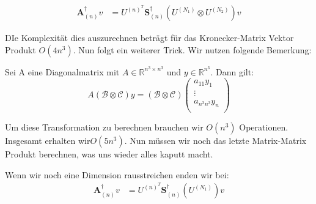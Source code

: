 \begin{equation}
\begin{aligned}
\mathcal{\textbf{A}}^{\dagger}_{(n)}v&= U^{ (n) ^{T} }  \mathcal{\textbf{S}}^{\dagger}_{(n)} ( U^{ (N_{1})  } \otimes U^{ (N_{2})} ) v
\end{aligned}
\end{equation}

DIe Komplexität dies auszurechnen beträgt für das Kronecker-Matrix Vektor Produkt $O(4n^3)$. Nun folgt ein weiterer Trick. Wir nutzen folgende Bemerkung:

\begin{Bemerkung}
Sei A eine Diagonalmatrix mit $A \in \mathbb{R}^{n^3 \times n^3}$ und $y \in \mathbb{R}^{n^3}$. Dann gilt:
\begin{equation*}
A(\mathcal{B} \otimes \mathcal{C})y = (\mathcal{B} \otimes \mathcal{C}) 
\begin{pmatrix}
a_{11} y_1 \\ \vdots \\ a_{n^3 n^3} y_n \\
\end{pmatrix}
\end{equation*}
\end{Bemerkung}

Um diese Transformation zu berechnen brauchen wir $O(n^3)$ Operationen. Insgesamt erhalten wir$ O(5n^3)$. Nun müssen wir noch das letzte Matrix-Matrix Produkt berechnen, was uns wieder alles kaputt macht.

Wenn wir noch eine Dimension rausstreichen enden wir bei:
\begin{equation}
\begin{aligned}
\mathcal{\textbf{A}}^{\dagger}_{(n)}v&= U^{ (n) ^{T} }  \mathcal{\textbf{S}}^{\dagger}_{(n)} ( U^{ (N_{1})  } ) v
\end{aligned}
\end{equation}